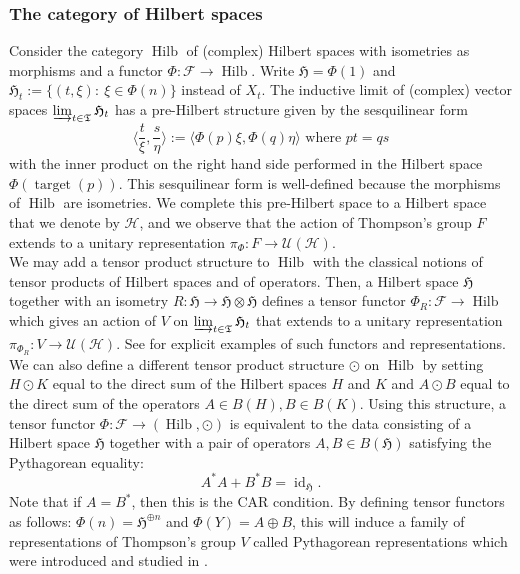 \documentclass[a4paper,12pt]{amsart}
\numberwithin{equation}{section}
\theoremstyle{definition}
\DeclareMathOperator{\id}{id}
\newcommand{\cF}{\mathcal F}
\newcommand{\fH}{\mathfrak H}
\newcommand{\scrH}{\mathscr H}
\DeclareMathOperator{\Hilb}{Hilb}
\newcommand{\ot}{\otimes}\newcommand{\otmin}{\otimes_{\text{min}}}
\newcommand{\fT}{\mathfrak T}
\DeclareMathOperator{\target}{target}
\newcommand{\cU}{\mathcal U}
\begin{document}
\subsubsection{The category of Hilbert spaces}
Consider the category $\Hilb$ of (complex) Hilbert spaces with isometries as morphisms and a functor $\Phi:\cF\to \Hilb.$
Write $\fH=\Phi(1)$ and $\fH_t:=\{(t,\xi) : \ \xi\in\Phi(n)\}$ instead of $X_t.$
The inductive limit of (complex) vector spaces $\varinjlim_{t\in\fT} \fH_t$ has a pre-Hilbert structure given by the sesquilinear form
$$\langle \dfrac{t}{\xi} , \dfrac{s}{\eta} \rangle := \langle \Phi(p)\xi , \Phi(q) \eta \rangle \text{ where } {pt = qs}$$
with the inner product on the right hand side performed in the Hilbert space $\Phi(\target(p))$. 
This sesquilinear form is well-defined because the morphisms of $\Hilb$ are isometries.
We complete this pre-Hilbert space to a Hilbert space that we denote by $\scrH$, and we observe that the action of Thompson's group $F$ extends to a unitary representation $\pi_\Phi:F\to \cU(\scrH)$.
\\[0.1cm]
We may add a tensor product structure to $\Hilb$ with the classical notions of tensor products of Hilbert spaces and of operators.
Then, a Hilbert space $\fH$ together with an isometry $R:\fH\to \fH\ot \fH$ defines a tensor functor $\Phi_R:\cF\to\Hilb$ which gives an action of $V$ on $\varinjlim_{t\in\fT} \fH_t$ that extends to a unitary representation $\pi_{\Phi_R}:V\to\cU(\scrH)$.
See \cite{Brot-Jones18-1} for explicit examples of such functors and representations.
\\[0.25cm]
We can also define a different tensor product structure $\odot$ on $\Hilb$ by setting $H\odot K$ equal to the direct sum of the Hilbert spaces $H$ and $K$ and $A\odot B$ equal to the direct sum of the operators $A\in B(H), B\in B(K).$
Using this structure, a tensor functor $\Phi:\cF\to (\Hilb,\odot)$ is equivalent to the data consisting of a Hilbert space $\fH$ together with a pair of operators $A,B\in B(\fH)$ satisfying the Pythagorean equality:
$$A^*A+B^*B = \id_\fH.$$
Note that if $A=B^*$, then this is the CAR condition.
By defining tensor functors as follows: $\Phi(n)= \fH^{\oplus n}$ and $\Phi(Y)= A\oplus B$, this will induce a family of representations of Thompson's group $V$ called Pythagorean representations which were introduced and studied in \cite{Brot-Jones18-2}.
\end{document}
